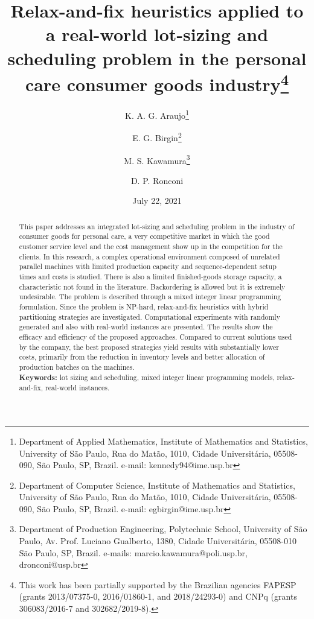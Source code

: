 \documentclass[11pt]{article}
\begin{document}
\title{Relax-and-fix heuristics applied to a real-world lot-sizing and scheduling problem in the personal care consumer goods industry\thanks{This work has been partially supported by the Brazilian agencies FAPESP (grants 2013/07375-0, 2016/01860-1, and 2018/24293-0) and CNPq (grants 306083/2016-7 and 302682/2019-8).}}

\author{
    K. A. G. Araujo\thanks{Department of Applied Mathematics, Institute of
    Mathematics and Statistics, University of S\~ao Paulo, Rua do
    Mat\~ao, 1010, Cidade Universit\'aria, 05508-090, S\~ao Paulo, SP,
    Brazil. e-mail: kennedy94@ime.usp.br}
 \and 
    E. G. Birgin\thanks{Department of Computer Science, Institute of
    Mathematics and Statistics, University of S\~ao Paulo, Rua do
    Mat\~ao, 1010, Cidade Universit\'aria, 05508-090, S\~ao Paulo, SP,
    Brazil. e-mail: egbirgin@ime.usp.br}
 \and
    M. S. Kawamura\thanks{Department of Production Engineering, Polytechnic 
    School, University of S\~ao Paulo, Av. Prof. Luciano Gualberto, 1380, 
    Cidade Universit\'aria, 05508-010 São Paulo, SP, Brazil. e-mails: 
    marcio.kawamura@poli.usp.br, dronconi@usp.br}
 \and
    D. P. Ronconi\footnotemark[4]
}

\date{July 22, 2021}

\maketitle

\begin{abstract}
This paper addresses an integrated lot-sizing and scheduling problem in the industry of consumer goods for personal care, a very competitive market in which the good customer service level and the cost management show up in the competition for the clients. In this research, a complex operational environment composed of unrelated parallel machines with limited production capacity and sequence-dependent setup times and costs is studied. There is also a limited finished-goods storage capacity, a characteristic not found in the literature. Backordering is allowed but it is extremely undesirable. The problem is described through a mixed integer linear programming formulation. Since the problem is NP-hard, relax-and-fix heuristics with hybrid partitioning strategies are investigated. Computational experiments with randomly generated and also with real-world instances are presented. The results show the efficacy and efficiency of the proposed approaches. Compared to current solutions used by the company, the best proposed strategies yield results with substantially lower costs, primarily from the reduction in inventory levels and better allocation of production batches on the machines.\\

\noindent
\textbf{Keywords:} lot sizing and scheduling, mixed integer linear programming models, relax-and-fix, real-world instances.\\
\end{abstract}
\end{document}
